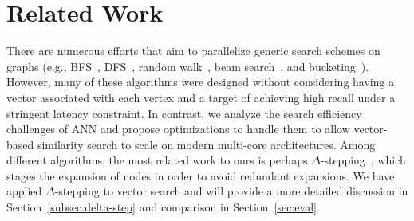 \section{Related Work}\label{sec:related}

There are numerous efforts that aim to parallelize generic search schemes on graphs (e.g., BFS~\cite{shun2013ligra}, DFS~\cite{naumov2017parallel}, random walk~\cite{talati2021deep}, beam search~\cite{meister2020best}, and bucketing~\cite{sridhar2019delta,zhang2020optimizing}). However, many of these algorithms were designed without considering having a vector associated with each vertex and a target of achieving high recall under a stringent latency constraint. In contrast, we analyze the search efficiency challenges of ANN and propose optimizations to handle them to allow vector-based similarity search to scale on modern multi-core architectures. Among different algorithms, the most related work to ours is perhaps $\Delta$-stepping~\cite{zhang2020optimizing}, which stages the expansion of nodes in order to avoid redundant expansions. We have applied $\Delta$-stepping to vector search and will provide a more detailed discussion in Section~\ref{subsec:delta-step} and comparison in Section~\ref{sec:eval}.

